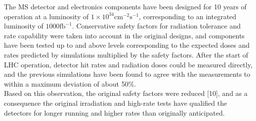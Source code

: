 The MS detector and electronics components have been designed for 10 years of operation
at a luminosity of $\mathrm{1\times 10^{34}cm^{-2} s^{-1}}$, corresponding to an integrated luminosity of $\mathrm{1000 fb^{-1}}$. 
Conservative safety factors for radiation tolerance and rate capability were taken
into account in the original designs, and components have been tested up to and above
levels corresponding to the expected doses and rates predicted by simulations multiplied
by the safety factors. After the start of LHC operation, detector hit rates and radiation doses
could be measured directly, and the previous simulations have been found to agree with
the measurements to within a maximum deviation of about 50$\%$.
\\Based on this observation, the original safety factors were reduced [10], and as a consequence the original irradiation and high-rate tests have qualified the detectors for longer running and higher rates than originally anticipated.


